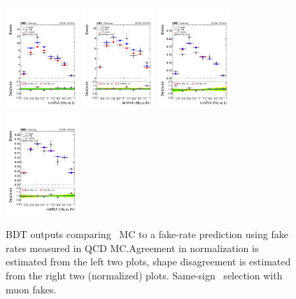 \begin{figure}[htb]
 \centering
 \includegraphics[width=0.245\textwidth]{figures/FR_closures/thqMVA_tt_2lss_em_mufake_norm.pdf} 
 \includegraphics[width=0.245\textwidth]{figures/FR_closures/thqMVA_ttv_2lss_em_mufake_norm.pdf} 
 \includegraphics[width=0.245\textwidth]{figures/FR_closures/thqMVA_tt_2lss_em_mufake_shape.pdf} 
 \includegraphics[width=0.245\textwidth]{figures/FR_closures/thqMVA_ttv_2lss_em_mufake_shape.pdf}\\ 
\caption{BDT outputs comparing \ttbar\ MC to a fake-rate prediction using fake rates measured in QCD MC.\@ Agreement in normalization is estimated from the left two plots, shape disagreement is estimated from the right two (normalized) plots. Same-sign \emu\ selection with muon fakes.} 
\label{fig:frclosure_2lss_em_mufake}
\end{figure} 

